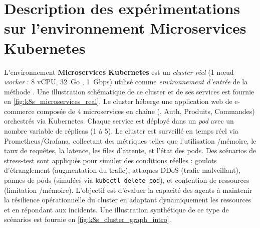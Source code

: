\section{Description des expérimentations sur l'environnement Microservices Kubernetes}


L'environnement \textbf{Microservices Kubernetes} est un \emph{cluster réel} (1 nœud \textit{worker} : 8 vCPU, 32~Go , 1~Gbps) utilisé comme \emph{environnement d'entrée} de la méthode . Une illustration schématique de ce cluster et de ses services est fournie en \autoref{fig:k8s_microservices_real}. Le cluster héberge une application web de e-commerce composée de 4 microservices en chaîne (, Auth, Produits, Commandes) orchestrés via Kubernetes. Chaque service est déployé dans un \emph{pod} avec un nombre variable de réplicas (1 à 5). Le cluster est surveillé en temps réel via Prometheus/Grafana, collectant des métriques telles que l'utilisation /mémoire, le taux de requêtes, la latence, les files d'attente, et l'état des pods. Des scénarios de stress-test sont appliqués pour simuler des conditions réelles : goulots d'étranglement (augmentation du trafic), attaques DDoS (trafic malveillant), pannes de pods (simulées via \texttt{kubectl delete pod}), et contention de ressources (limitation /mémoire). L'objectif est d'évaluer la capacité des agents à maintenir la résilience opérationnelle du cluster en adaptant dynamiquement les ressources et en répondant aux incidents. Une illustration synthétique de ce type de scénarios est fournie en \autoref{fig:k8s_cluster_graph_intro}.

